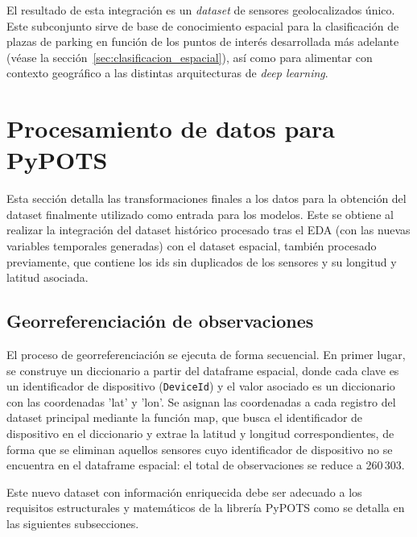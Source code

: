 El resultado de esta integración es un \textit{dataset} de sensores geolocalizados único. Este subconjunto sirve de base de conocimiento espacial para la clasificación de plazas de parking en función de los puntos de interés desarrollada más adelante (véase la sección~\ref{sec:clasificacion_espacial}), así como para alimentar con contexto geográfico a las distintas arquitecturas de \textit{deep learning}.




\section{Procesamiento de datos para PyPOTS}
\label{subsec:procesamiento_pypots}

Esta sección detalla las transformaciones finales a los datos para la obtención del dataset finalmente utilizado como entrada para los modelos. Este se obtiene al realizar la integración del dataset histórico procesado tras el EDA (con las nuevas variables temporales generadas) con el dataset espacial, también procesado previamente, que contiene los ids sin duplicados de los sensores y su longitud y latitud asociada. 

\subsection{Georreferenciación de observaciones}
El proceso de georreferenciación se ejecuta de forma secuencial. En primer lugar, se construye un diccionario a partir del dataframe espacial, donde cada clave es un identificador de dispositivo (\texttt{DeviceId}) y el valor asociado es un diccionario con las coordenadas 'lat' y 'lon'. Se asignan las coordenadas a cada registro del dataset principal mediante la función map, que busca el identificador de dispositivo en el diccionario y extrae la latitud y longitud correspondientes, de forma que se eliminan aquellos sensores cuyo identificador de dispositivo no se encuentra en el dataframe espacial: el total de observaciones se reduce a 260\,303.

Este nuevo dataset con información enriquecida debe ser adecuado a los requisitos estructurales y matemáticos de la librería PyPOTS como se detalla en las siguientes subsecciones.

